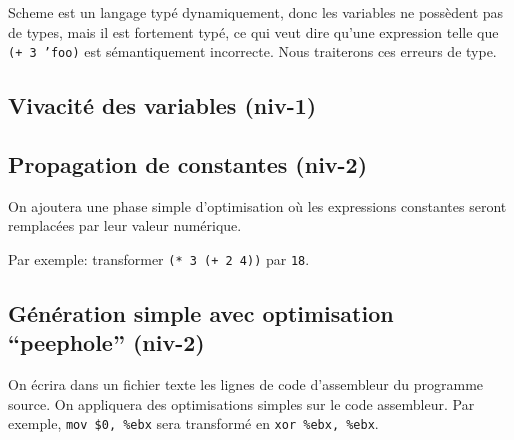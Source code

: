 \documentclass[11pt]{article}
\begin{document}
Scheme est un langage typé dynamiquement, donc les variables ne
possèdent pas de types, mais il est fortement typé, ce qui veut dire
qu'une expression telle que \texttt{(+ 3 'foo)} est sémantiquement
incorrecte.  Nous traiterons ces erreurs de type.

\subsection{Vivacité des variables (niv-1)}

\subsection{Propagation de constantes (niv-2)}

On ajoutera une phase simple d'optimisation où les expressions
constantes seront remplacées par leur valeur numérique.

Par exemple: transformer \texttt{(* 3 (+ 2 4))} par \texttt{18}.


\subsection{Génération simple avec optimisation ``peephole'' (niv-2)}

On écrira dans un fichier texte les lignes de code d'assembleur du
programme source.  On appliquera des optimisations simples sur le code
assembleur.  Par exemple, \texttt{mov \$0, \%ebx} sera transformé en
\texttt{xor \%ebx, \%ebx}.
\end{document}
